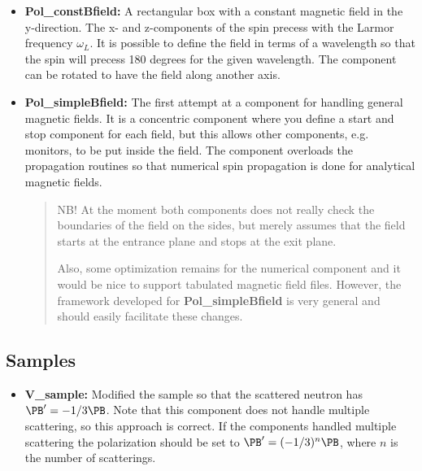 \begin{itemize}
\item \textbf{Pol\_constBfield:} A rectangular box with a constant magnetic
  field in the y-direction. The x- and z-components of the spin precess with
  the Larmor frequency $\omega_L$. It is possible to define the field in terms
  of a wavelength so that the spin will precess 180 degrees for the given
  wavelength. The component can be rotated to have the field along another
  axis. \\

\item \textbf{Pol\_simpleBfield:} The first attempt at a component for
  handling general magnetic fields. It is a concentric component where you
  define a start and stop component for each field, but this allows other
  components, e.g. monitors, to be put inside the field. The component
  overloads the propagation routines so that numerical spin propagation is
  done for analytical magnetic fields.

  \begin{quote}
    NB! At the moment both components does not really check the boundaries of
    the field on the sides, but merely assumes that the field starts at the
    entrance plane and stops at the exit plane.

    Also, some optimization remains for the numerical component and it would
    be nice to support tabulated magnetic field files. However, the framework
    developed for \textbf{Pol\_simpleBfield} is very general and should
    easily facilitate these changes.
  \end{quote}

\end{itemize}


\subsection{Samples}

\begin{itemize}
\item \textbf{V\_sample:} Modified the sample so that the scattered
  neutron has $\PB' = -1/3\PB$. Note that this component does not
  handle multiple scattering, so this approach is correct. If the
  components handled multiple scattering the polarization should be
  set to $\PB' = (-1/3)^n\PB$, where $n$ is the number of
  scatterings.\\
\end{itemize}


